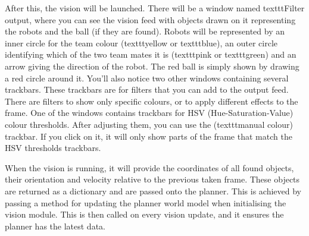 After this, the vision will be launched. There will be a window named texttt{Filter output}, where you can see the vision feed with objects drawn on it representing the robots and the ball (if they are found). Robots will be represented by an inner circle for the team colour (texttt{yellow} or texttt{blue}), an outer circle identifying which of the two team mates it is (texttt{pink} or texttt{green}) and an arrow giving the direction of the robot.  The red ball is simply shown by drawing a red circle around it. You'll also notice two other windows containing several trackbars. These trackbars are for filters that you can add to the output feed. There are filters to show only specific colours, or to apply different effects to the frame. One of the windows contains trackbars for HSV (Hue-Saturation-Value) colour thresholds. After adjusting them, you can use the (texttt{manual colour}) trackbar. If you click on it, it will only show parts of the frame that match the HSV thresholds trackbars.

When the vision is running, it will provide the coordinates of all found objects, their orientation and velocity relative to the previous taken frame. These objects are returned as a dictionary and are passed onto the planner. This is achieved by passing a method for updating the planner world model when initialising the vision module. This is then called on every vision update, and it ensures the planner has the latest data.
